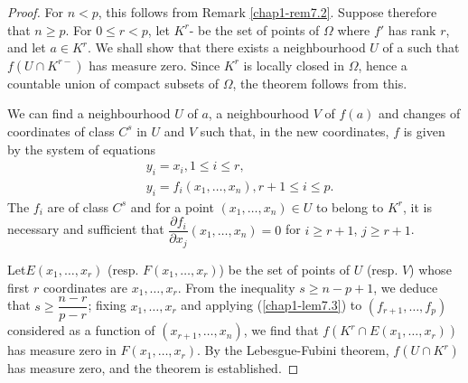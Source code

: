\begin{proof}
For $n<p$, this follows from Remark \ref{chap1-rem7.2}. Suppose therefore that $n\geq p$. For $0\leq r<p$, let $K^{r}$- be the set of points of $\Omega$ where $f'$ has rank $r$, and let $a\in K^{r}$. We shall show that there exists a neighbourhood $U$ of a such that $f(U\cap K^{r-})$ has measure zero. Since $K^{r}$ is locally closed in $\Omega$, hence a countable union of compact subsets of $\Omega$, the theorem follows from this.

We can find a neighbourhood $U$ of $a$, a neighbourhood $V$ of $f(a)$ and changes of coordinates of class $C^{s}$ in $U$ and $V$ such that, in the new coordinates, $f$ is given by the system of equations
\begin{align*}
& y_{i}=x_{i}, 1\leq i\leq r,\\
& y_{i}=f_{i}(x_{1},\ldots,x_{n}),r+1\leq i\leq p.
\end{align*}
The $f_{i}$ are of class $C^{s}$ and for a point $(x_{1},\ldots,x_{n})\in U$ to belong to $K^{r}$, it is necessary and sufficient that $\dfrac{\partial f_{i}}{\partial x_{j}}(x_{1},\ldots,x_{n})=0$ for $i\geq r+1$, $j\geq r+1$.

Let\pageoriginale $E(x_{1},\ldots,x_{r})$ (resp. $F(x_{1},\ldots,x_{r})$) be the set of points of $U$ (resp. $V$) whose first $r$ coordinates are $x_{1},\ldots,x_{r}$. From the inequality $s\geq n-p+1$, we deduce that $s\geq \dfrac{n-r}{p-r}$; fixing $x_{1},\ldots,x_{r}$ and applying (\ref{chap1-lem7.3}) to $(f_{r+1},\ldots,f_{p})$ considered as a function of $(x_{r+1},\ldots,x_{n})$, we find that $f(K^{r}\cap E(x_{1},\ldots,x_{r}))$ has measure zero in $F(x_{1},\ldots,x_{r})$. By the Lebesgue-Fubini theorem, $f(U\cap K^{r})$ has measure zero, and the theorem is established.
\end{proof}


